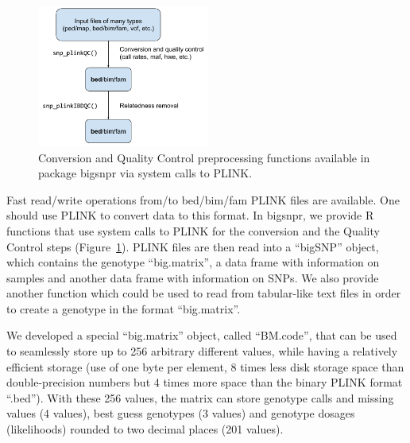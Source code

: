 \documentclass{bioinfo}
\begin{document}
\begin{methods}
\begin{figure}[!tpb]
\centerline{\includegraphics[width=160pt]{conversion+QC.pdf}}
\caption{Conversion and Quality Control preprocessing functions available in package bigsnpr via system calls to PLINK.}\label{fig:qc}
\end{figure}

Fast read/write operations from/to bed/bim/fam PLINK files are available. One should use PLINK to convert data to this format. In bigsnpr, we provide R functions that use system calls to PLINK for the conversion and the Quality Control steps (Figure~\ref{fig:qc}). PLINK files are then read into a ``bigSNP'' object, which contains the genotype ``big.matrix'', a data frame with information on samples and another data frame with information on SNPs. We also provide another function which could be used to read from tabular-like text files in order to create a genotype in the format ``big.matrix''.

We developed a special ``big.matrix'' object, called ``BM.code'', that can be used to seamlessly store up to 256 arbitrary different values, while having a relatively efficient storage (use of one byte per element, 8 times less disk storage space than double-precision numbers but 4 times more space than the binary PLINK format ``.bed''). With these 256 values, the matrix can store genotype calls and missing values (4 values), best guess genotypes (3 values) and genotype dosages (likelihoods) rounded to two decimal places (201 values).


\end{methods}
\end{document}
